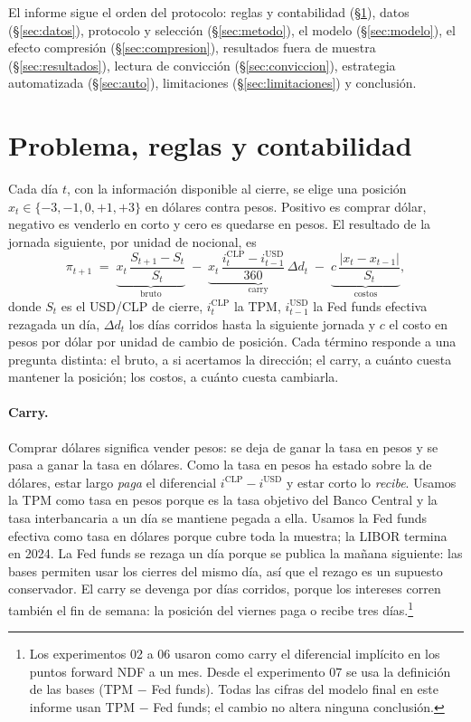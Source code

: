 \documentclass[10pt,a4paper]{article}
\begin{document}
El informe sigue el orden del protocolo: reglas y contabilidad (§\ref{sec:reglas}),
datos (§\ref{sec:datos}), protocolo y selección (§\ref{sec:metodo}), el modelo
(§\ref{sec:modelo}), el efecto compresión (§\ref{sec:compresion}), resultados fuera
de muestra (§\ref{sec:resultados}), lectura de convicción (§\ref{sec:conviccion}),
estrategia automatizada (§\ref{sec:auto}), limitaciones (§\ref{sec:limitaciones}) y
conclusión.

\section{Problema, reglas y contabilidad}\label{sec:reglas}

Cada día $t$, con la información disponible al cierre, se elige una posición
$x_t\in\{-3,-1,0,+1,+3\}$ en dólares contra pesos. Positivo es comprar dólar,
negativo es venderlo en corto y cero es quedarse en pesos. El resultado de la
jornada siguiente, por unidad de nocional, es
\begin{equation}\label{eq:pnl}
  \pi_{t+1} \;=\;
  \underbrace{x_t\,\frac{S_{t+1}-S_t}{S_t}}_{\text{bruto}}
  \;-\;
  \underbrace{x_t\,\frac{i^{\text{CLP}}_t - i^{\text{USD}}_{t-1}}{360}\,\Delta d_{t}}_{\text{carry}}
  \;-\;
  \underbrace{c\,\frac{|x_t - x_{t-1}|}{S_t}}_{\text{costos}},
\end{equation}
donde $S_t$ es el USD/CLP de cierre, $i^{\text{CLP}}_t$ la TPM, $i^{\text{USD}}_{t-1}$
la Fed funds efectiva rezagada un día, $\Delta d_t$ los días corridos hasta la
siguiente jornada y $c$ el costo en pesos por dólar por unidad de cambio de
posición. Cada término responde a una pregunta distinta: el bruto, a si acertamos
la dirección; el carry, a cuánto cuesta mantener la posición; los costos, a cuánto
cuesta cambiarla.

\paragraph{Carry.} Comprar dólares significa vender pesos: se deja de ganar la
tasa en pesos y se pasa a ganar la tasa en dólares. Como la tasa en pesos ha
estado sobre la de dólares, estar largo \emph{paga} el diferencial
$i^{\text{CLP}}-i^{\text{USD}}$ y estar corto lo \emph{recibe}. Usamos la TPM como
tasa en pesos porque es la tasa objetivo del Banco Central y la tasa interbancaria
a un día se mantiene pegada a ella. Usamos la Fed funds efectiva como tasa en
dólares porque cubre toda la muestra; la LIBOR termina en 2024. La Fed funds se
rezaga un día porque se publica la mañana siguiente: las bases permiten usar los
cierres del mismo día, así que el rezago es un supuesto conservador. El carry se
devenga por días corridos, porque los intereses corren también el fin de semana:
la posición del viernes paga o recibe tres días.\footnote{Los experimentos 02 a 06
usaron como carry el diferencial implícito en los puntos forward NDF a un mes.
Desde el experimento 07 se usa la definición de las bases (TPM $-$ Fed funds).
Todas las cifras del modelo final en este informe usan TPM $-$ Fed funds; el cambio
no altera ninguna conclusión.}
\end{document}
